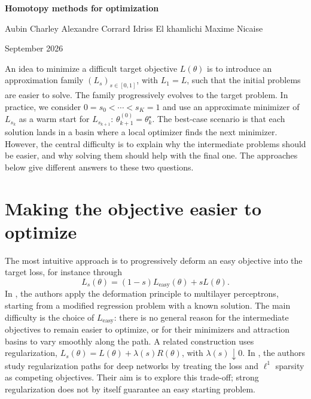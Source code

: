 \documentclass[11pt,a4paper]{article}
\begin{document}
\begin{center}
    {\Large\bfseries Homotopy methods for optimization}\par
    \vspace{4pt}
    Aubin Charley \quad Alexandre Corrard \quad
    Idriss El khamlichi \quad Maxime Nicaise\par
    \vspace{2pt}
    September 2026
\end{center}
\vspace{-4pt}

An idea to minimize a difficult target objective $L(\theta)$ is to introduce
an approximation family $(L_s)_{s\in[0,1]}$, with $L_1=L$, such that the
initial problems are easier to solve. The family progressively evolves to
the target problem. In practice, we consider $0=s_0<\cdots<s_K=1$ and use
an approximate minimizer of $L_{s_k}$ as a warm start for $L_{s_{k+1}}$:
$\theta_{k+1}^{(0)}=\theta_k^\star$. The best-case scenario is that each
solution lands in a basin where a local optimizer finds the next minimizer.
However, the central difficulty is to explain why the intermediate problems
should be easier, and why solving them should help with the final one.
The approaches below give different answers to these two questions.

\section{Making the objective easier to optimize}

The most intuitive approach is to progressively deform an easy objective
into the target loss, for instance through
\[
    L_s(\theta)=(1-s)L_{\mathrm{easy}}(\theta)+sL(\theta).
\]
In \cite{LENDL1998359}, the authors apply the deformation principle to
multilayer perceptrons, starting from a modified regression problem with
a known solution. The main difficulty is the choice of $L_{\mathrm{easy}}$:
there is no general reason for the intermediate objectives to remain easier
to optimize, or for their minimizers and attraction basins to vary smoothly
along the path. A related construction uses regularization,
$L_s(\theta)=L(\theta)+\lambda(s)R(\theta)$, with $\lambda(s)\downarrow0$.
In \cite{amakor2025continuation}, the authors study regularization paths for
deep networks by treating the loss and $\ell^1$ sparsity as competing
objectives. Their aim is to explore this trade-off; strong regularization
does not by itself guarantee an easy starting problem.
\end{document}
